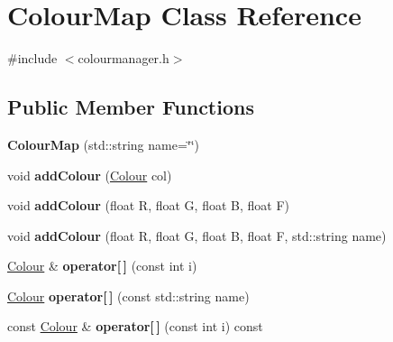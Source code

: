 \hypertarget{classColourMap}{}\section{Colour\+Map Class Reference}
\label{classColourMap}


{\ttfamily \#include $<$colourmanager.\+h$>$}

\subsection*{Public Member Functions}
\begin{DoxyCompactItemize}
\item 
\mbox{\label{classColourMap_a1a2a0c437c3f60d0f3d082387741d443}} 
{\bfseries Colour\+Map} (std\+::string name=\char`\"{}\char`\"{})
\item 
\mbox{\label{classColourMap_ad378f3d48e33c2fb4d2214696b3ff276}} 
void {\bfseries add\+Colour} (\hyperlink{classColour}{Colour} col)
\item 
\mbox{\label{classColourMap_a6ce7c847e74160f0b5d5fa46ef7fe249}} 
void {\bfseries add\+Colour} (float R, float G, float B, float F)
\item 
\mbox{\label{classColourMap_a942403563c0a5b501fb1927187e2f3df}} 
void {\bfseries add\+Colour} (float R, float G, float B, float F, std\+::string name)
\item 
\mbox{\label{classColourMap_a760a10f9844cd928c3404fee195cf502}} 
\hyperlink{classColour}{Colour} \& {\bfseries operator\mbox{[}$\,$\mbox{]}} (const int i)
\item 
\mbox{\label{classColourMap_a398cff20d5edad340b9794214d33c711}} 
\hyperlink{classColour}{Colour} {\bfseries operator\mbox{[}$\,$\mbox{]}} (const std\+::string name)
\item 
\mbox{\label{classColourMap_a869eee79714568811b9bee1a61ebddc3}} 
const \hyperlink{classColour}{Colour} \& {\bfseries operator\mbox{[}$\,$\mbox{]}} (const int i) const
\item 
\mbox{\label{classColourMap_aaf101d60702237a8c2d038f3b49ced66}} 

\end{DoxyCompactItemize}
